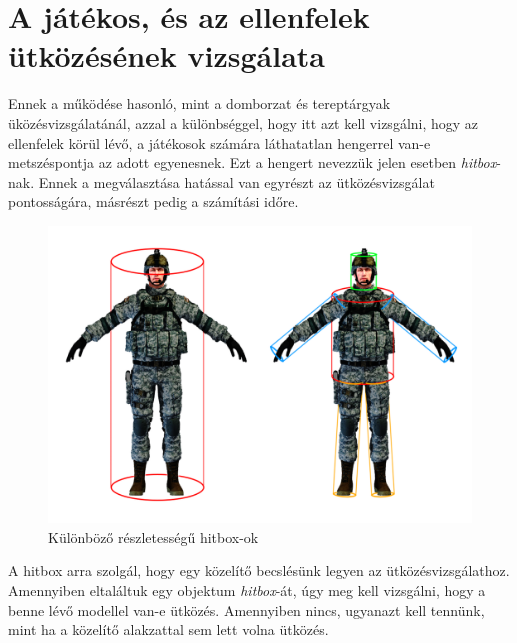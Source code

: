 \section{A játékos, és az ellenfelek ütközésének vizsgálata}

Ennek a működése hasonló, mint a domborzat és tereptárgyak üközésvizsgálatánál, azzal a különbséggel, hogy itt azt kell vizsgálni, hogy az ellenfelek körül lévő, a játékosok számára láthatatlan hengerrel van-e metszéspontja az adott egyenesnek. Ezt a hengert nevezzük jelen esetben \textit{hitbox}-nak. Ennek a megválasztása hatással van egyrészt az ütközésvizsgálat pontosságára, másrészt pedig a számítási időre.

\begin{figure}[h]
\centering
\includegraphics[scale=0.38]{kepek/hitbox.png}
\caption{Különböző részletességű hitbox-ok}
\label{fig:hitbox}
\end{figure}

A hitbox arra szolgál, hogy egy közelítő becslésünk legyen az ütközésvizsgálathoz. Amennyiben eltaláltuk egy objektum \textit{hitbox}-át, úgy meg kell vizsgálni, hogy a benne lévő modellel van-e ütközés. Amennyiben nincs, ugyanazt kell tennünk, mint ha a közelítő alakzattal sem lett volna ütközés.


